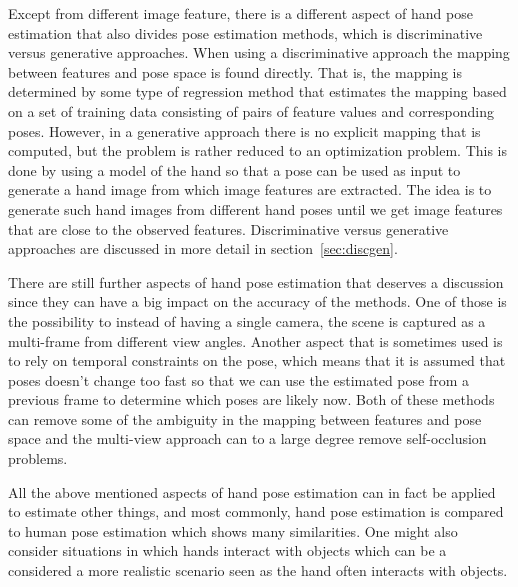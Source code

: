 \documentclass[a4paper,11pt]{kth-mag}
\begin{document}
Except from different image feature, there is a different aspect of hand pose estimation that also divides pose estimation methods, which is discriminative versus generative approaches.
When using a discriminative approach the mapping between features and pose space is found directly.
That is, the mapping is determined by some type of regression method that estimates the mapping based on a set of training data consisting of pairs of feature values and corresponding poses.
However, in a generative approach there is no explicit mapping that is computed, but the problem is rather reduced to an optimization problem.
This is done by using a model of the hand so that a pose can be used as input to generate a hand image from which image features are extracted.
The idea is to generate such hand images from different hand poses until we get image features that are close to the observed features.
Discriminative versus generative approaches are discussed in more detail in section~\ref{sec:discgen}.

There are still further aspects of hand pose estimation that deserves a discussion since they can have a big impact on the accuracy of the methods.
One of those is the possibility to instead of having a single camera, the scene is captured as a multi-frame from different view angles.
Another aspect that is sometimes used is to rely on temporal constraints on the pose, which means that it is assumed that poses doesn't change too fast so that we can use the estimated pose from a previous frame to determine which poses are likely now.
Both of these methods can remove some of the ambiguity in the mapping between features and pose space and the multi-view approach can to a large degree remove self-occlusion problems.

All the above mentioned aspects of hand pose estimation can in fact be applied to estimate other things, and most commonly, hand pose estimation is compared to human pose estimation which shows many similarities. 
One might also consider situations in which hands interact with objects which can be a considered a more realistic scenario seen as the hand often interacts with objects. 
\end{document}
